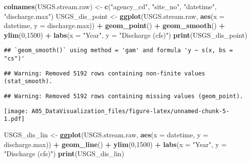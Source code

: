 \documentclass[]{article}
\newenvironment{Shaded}{\begin{snugshade}}{\end{snugshade}}
\newcommand{\KeywordTok}[1]{\textcolor[rgb]{0.13,0.29,0.53}{\textbf{#1}}}
\newcommand{\DataTypeTok}[1]{\textcolor[rgb]{0.13,0.29,0.53}{#1}}
\newcommand{\DecValTok}[1]{\textcolor[rgb]{0.00,0.00,0.81}{#1}}
\newcommand{\StringTok}[1]{\textcolor[rgb]{0.31,0.60,0.02}{#1}}
\newcommand{\OperatorTok}[1]{\textcolor[rgb]{0.81,0.36,0.00}{\textbf{#1}}}
\newcommand{\NormalTok}[1]{#1}
\begin{document}
\begin{Shaded}
\begin{Highlighting}[]
\KeywordTok{colnames}\NormalTok{(USGS.stream.raw) <-}\StringTok{ }\KeywordTok{c}\NormalTok{(}\StringTok{"agency_cd"}\NormalTok{, }\StringTok{"site_no"}\NormalTok{, }\StringTok{"datetime"}\NormalTok{,}
                               \StringTok{"discharge.max"}\NormalTok{)}
\NormalTok{USGS_dis_point <-}\StringTok{ }\KeywordTok{ggplot}\NormalTok{(USGS.stream.raw, }\KeywordTok{aes}\NormalTok{(}\DataTypeTok{x =}\NormalTok{ datetime, }\DataTypeTok{y =}\NormalTok{ discharge.max)) }\OperatorTok{+}
\StringTok{  }\KeywordTok{geom_point}\NormalTok{() }\OperatorTok{+}
\StringTok{  }\KeywordTok{geom_smooth}\NormalTok{() }\OperatorTok{+}
\StringTok{  }\KeywordTok{ylim}\NormalTok{(}\DecValTok{0}\NormalTok{,}\DecValTok{1500}\NormalTok{) }\OperatorTok{+}
\StringTok{  }\KeywordTok{labs}\NormalTok{(}\DataTypeTok{x =} \StringTok{"Year"}\NormalTok{, }\DataTypeTok{y =} \StringTok{"Discharge (cfs)"}\NormalTok{)}
\KeywordTok{print}\NormalTok{(USGS_dis_point)}
\end{Highlighting}
\end{Shaded}

\begin{verbatim}
## `geom_smooth()` using method = 'gam' and formula 'y ~ s(x, bs = "cs")'
\end{verbatim}

\begin{verbatim}
## Warning: Removed 5192 rows containing non-finite values (stat_smooth).
\end{verbatim}

\begin{verbatim}
## Warning: Removed 5192 rows containing missing values (geom_point).
\end{verbatim}

\texttt{[image: A05\_DataVisualization\_files/figure-latex/unnamed-chunk-5-1.pdf]}

\begin{Shaded}
\begin{Highlighting}[]
\NormalTok{USGS_dis_lin <-}\StringTok{ }\KeywordTok{ggplot}\NormalTok{(USGS.stream.raw, }\KeywordTok{aes}\NormalTok{(}\DataTypeTok{x =}\NormalTok{ datetime, }\DataTypeTok{y =}\NormalTok{ discharge.max)) }\OperatorTok{+}
\StringTok{  }\KeywordTok{geom_line}\NormalTok{() }\OperatorTok{+}
\StringTok{  }\KeywordTok{ylim}\NormalTok{(}\DecValTok{0}\NormalTok{,}\DecValTok{1500}\NormalTok{) }\OperatorTok{+}
\StringTok{  }\KeywordTok{labs}\NormalTok{(}\DataTypeTok{x =} \StringTok{"Year"}\NormalTok{, }\DataTypeTok{y =} \StringTok{"Discharge (cfs)"}\NormalTok{)}
\KeywordTok{print}\NormalTok{(USGS_dis_lin)}
\end{Highlighting}
\end{Shaded}
\end{document}
